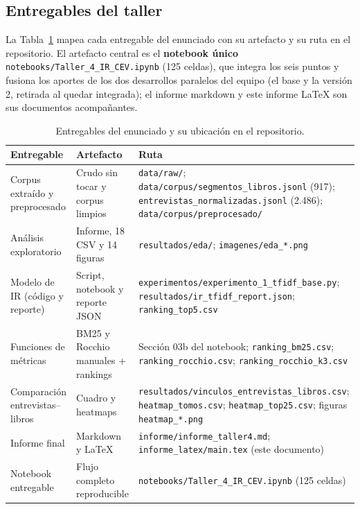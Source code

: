 \documentclass[11pt]{tg_usta}
\begin{document}
\subsection{Entregables del taller}

La Tabla~\ref{tab:entregables} mapea cada entregable del enunciado con su artefacto y su ruta en el repositorio. El artefacto central es el \textbf{notebook único} \texttt{notebooks/Taller\_4\_IR\_CEV.ipynb} (125 celdas), que integra los seis puntos y fusiona los aportes de los dos desarrollos paralelos del equipo (el base y la versión 2, retirada al quedar integrada); el informe markdown y este informe LaTeX son sus documentos acompañantes.

\begin{table}[H]
    \centering
    \caption{Entregables del enunciado y su ubicación en el repositorio.}
    \small
    \setlength{\tabcolsep}{5pt}
    \begin{tabular}{p{3.6cm} p{5.6cm} p{5.6cm}}
    \toprule
    Entregable & Artefacto & Ruta \\
    \midrule
    Corpus extraído y preprocesado & Crudo sin tocar y corpus limpios & \texttt{data/raw/}; \texttt{data/corpus/segmentos\_libros.jsonl} (917); \texttt{entrevistas\_normalizadas.jsonl} (2.486); \texttt{data/corpus/preprocesado/} \\
    Análisis exploratorio & Informe, 18 CSV y 14 figuras & \texttt{resultados/eda/}; \texttt{imagenes/eda\_*.png} \\
    Modelo de IR (código y reporte) & Script, notebook y reporte JSON & \texttt{experimentos/experimento\_1\_tfidf\_base.py}; \texttt{resultados/ir\_tfidf\_report.json}; \texttt{ranking\_top5.csv} \\
    Funciones de métricas & BM25 y Rocchio manuales + rankings & Sección 03b del notebook; \texttt{ranking\_bm25.csv}; \texttt{ranking\_rocchio.csv}; \texttt{ranking\_rocchio\_k3.csv} \\
    Comparación entrevistas--libros & Cuadro y heatmaps & \texttt{resultados/vinculos\_entrevistas\_libros.csv}; \texttt{heatmap\_tomos.csv}; \texttt{heatmap\_top25.csv}; figuras \texttt{heatmap\_*.png} \\
    Informe final & Markdown y LaTeX & \texttt{informe/informe\_taller4.md}; \texttt{informe\_latex/main.tex} (este documento) \\
    Notebook entregable & Flujo completo reproducible & \texttt{notebooks/Taller\_4\_IR\_CEV.ipynb} (125 celdas) \\
    \bottomrule
    \end{tabular}
    \label{tab:entregables}
\end{table}
\end{document}
